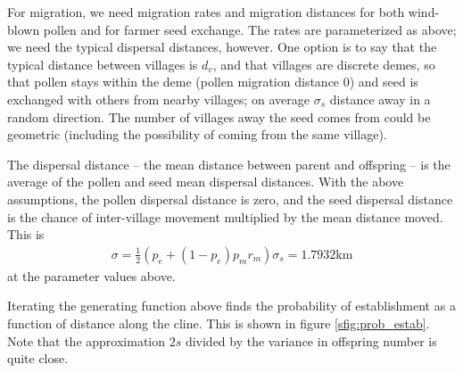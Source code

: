 For migration, we need migration rates and migration distances for both wind-blown pollen
and for farmer seed exchange.
The rates are parameterized as above;
we need the typical dispersal distances, however.
One option is to say that the typical distance between villages is $d_v$,
and that villages are discrete demes,
so that pollen stays within the deme (pollen migration distance 0)
and seed is exchanged with others from nearby villages;
on average $\sigma_s$ distance away in a random direction.
The number of villages away the seed comes from could be geometric 
(including the possibility of coming from the same village).

The dispersal distance
-- the mean distance between parent and offspring --
is the average of the pollen and seed mean dispersal distances.
With the above assumptions, the pollen dispersal distance is zero,
and the seed dispersal distance is the chance of inter-village movement
multiplied by the mean distance moved.
This is
\begin{align}
  \sigma = \frac{1}{2} (p_e + (1-p_e) p_m r_m ) \sigma_s = 1.7932 \text{km}
\end{align}
at the parameter values above.

Iterating the generating function above finds the probability of establishment as a function of distance along the cline.
This is shown in figure \ref{sfig:prob_estab}.
Note that the approximation $2s$ divided by the variance in offspring number is quite close.

